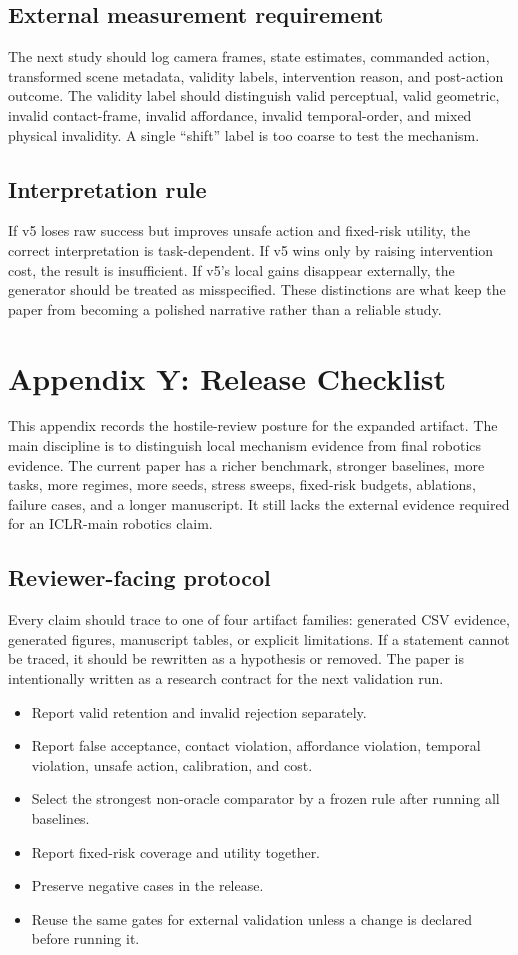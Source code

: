 \documentclass{article}
\begin{document}
\subsection{External measurement requirement}
The next study should log camera frames, state estimates, commanded action, transformed scene metadata, validity labels, intervention reason, and post-action outcome. The validity label should distinguish valid perceptual, valid geometric, invalid contact-frame, invalid affordance, invalid temporal-order, and mixed physical invalidity. A single ``shift'' label is too coarse to test the mechanism.

\subsection{Interpretation rule}
If v5 loses raw success but improves unsafe action and fixed-risk utility, the correct interpretation is task-dependent. If v5 wins only by raising intervention cost, the result is insufficient. If v5's local gains disappear externally, the generator should be treated as misspecified. These distinctions are what keep the paper from becoming a polished narrative rather than a reliable study.


\section{Appendix Y: Release Checklist}
This appendix records the hostile-review posture for the expanded artifact. The main discipline is to distinguish local mechanism evidence from final robotics evidence. The current paper has a richer benchmark, stronger baselines, more tasks, more regimes, more seeds, stress sweeps, fixed-risk budgets, ablations, failure cases, and a longer manuscript. It still lacks the external evidence required for an ICLR-main robotics claim.

\subsection{Reviewer-facing protocol}
Every claim should trace to one of four artifact families: generated CSV evidence, generated figures, manuscript tables, or explicit limitations. If a statement cannot be traced, it should be rewritten as a hypothesis or removed. The paper is intentionally written as a research contract for the next validation run.

\begin{itemize}
\item Report valid retention and invalid rejection separately.
\item Report false acceptance, contact violation, affordance violation, temporal violation, unsafe action, calibration, and cost.
\item Select the strongest non-oracle comparator by a frozen rule after running all baselines.
\item Report fixed-risk coverage and utility together.
\item Preserve negative cases in the release.
\item Reuse the same gates for external validation unless a change is declared before running it.
\end{itemize}
\end{document}
